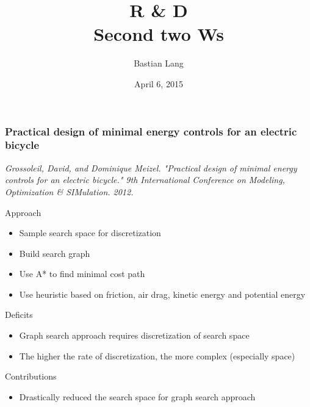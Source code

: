 \documentclass[8pt]{beamer}
\title[R \& D]{R \& D\\Second two Ws} %
\author{Bastian Lang} %
\institute[BRSU] %
{
Master of Autonomous Systems \\ %
}
\date{April 6, 2015}
\begin{document}
\listoffigures



\begin{frame}
	\frametitle{Practical design of minimal energy controls for an electric bicycle}
	\textit{Grossoleil, David, and Dominique Meizel. "Practical design of minimal energy controls for an electric bicycle." 9th International Conference on Modeling, Optimization \& SIMulation. 2012.}\vspace{5mm}
	
	Approach
	\begin{itemize}
		\item Sample search space for discretization
		\item Build search graph
		\item Use A* to find minimal cost path
		\item Use heuristic based on friction, air drag, kinetic energy and potential energy
	\end{itemize}
	
	Deficits
	\begin{itemize}
		\item Graph search approach requires discretization of search space
		\item The higher the rate of discretization, the more complex (especially space)
	\end{itemize}
	
	Contributions
	\begin{itemize}
		\item Drastically reduced the search space for graph search approach
	\end{itemize}
\end{frame}
\end{document}
